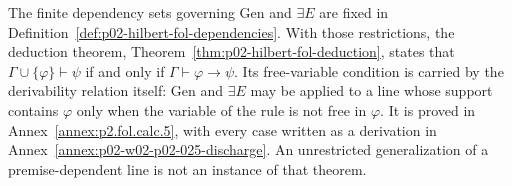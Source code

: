 The finite dependency sets governing Gen and \(\exists E\) are fixed in
Definition~\ref{def:p02-hilbert-fol-dependencies}.  With those restrictions,
the deduction theorem, Theorem~\ref{thm:p02-hilbert-fol-deduction}, states
that \(\Gamma\cup\{\varphi\}\vdash\psi\) if and only if
\(\Gamma\vdash\varphi\to\psi\).  Its free-variable condition is carried by the
derivability relation itself: Gen and \(\exists E\) may be applied to a line
whose support contains \(\varphi\) only when the variable of the rule is not
free in \(\varphi\).  It is proved in Annex~\ref{annex:p2.fol.calc.5}, with
every case written as a derivation in
Annex~\ref{annex:p02-w02-p02-025-discharge}.  An unrestricted generalization of a
premise-dependent line is not an instance of that theorem.
